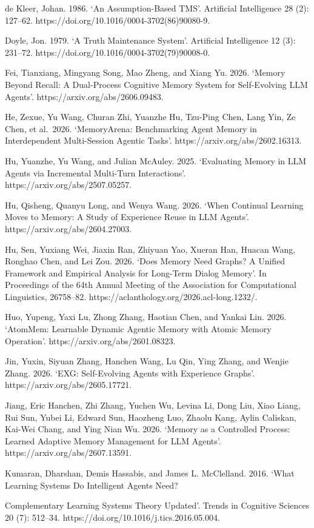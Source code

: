 \documentclass[
  english,
  a4paper,
  DIV=11,
  numbers=noendperiod]{scrreprt}
\begin{document}
de Kleer, Johan. 1986. `An Assumption-Based TMS'. Artificial
Intelligence 28 (2): 127--62.
https://doi.org/10.1016/0004-3702(86)90080-9.

Doyle, Jon. 1979. `A Truth Maintenance System'. Artificial Intelligence
12 (3): 231--72. https://doi.org/10.1016/0004-3702(79)90008-0.

Fei, Tianxiang, Mingyang Song, Mao Zheng, and Xiang Yu. 2026. `Memory
Beyond Recall: A Dual-Process Cognitive Memory System for Self-Evolving
LLM Agents'. https://arxiv.org/abs/2606.09483.

He, Zexue, Yu Wang, Churan Zhi, Yuanzhe Hu, Tzu-Ping Chen, Lang Yin, Ze
Chen, et al.~2026. `MemoryArena: Benchmarking Agent Memory in
Interdependent Multi-Session Agentic Tasks'.
https://arxiv.org/abs/2602.16313.

Hu, Yuanzhe, Yu Wang, and Julian McAuley. 2025. `Evaluating Memory in
LLM Agents via Incremental Multi-Turn Interactions'.
https://arxiv.org/abs/2507.05257.

Hu, Qisheng, Quanyu Long, and Wenya Wang. 2026. `When Continual Learning
Moves to Memory: A Study of Experience Reuse in LLM Agents'.
https://arxiv.org/abs/2604.27003.

Hu, Sen, Yuxiang Wei, Jiaxin Ran, Zhiyuan Yao, Xueran Han, Huacan Wang,
Ronghao Chen, and Lei Zou. 2026. `Does Memory Need Graphs? A Unified
Framework and Empirical Analysis for Long-Term Dialog Memory'. In
Proceedings of the 64th Annual Meeting of the Association for
Computational Linguistics, 26758--82.
https://aclanthology.org/2026.acl-long.1232/.

Huo, Yupeng, Yaxi Lu, Zhong Zhang, Haotian Chen, and Yankai Lin. 2026.
`AtomMem: Learnable Dynamic Agentic Memory with Atomic Memory
Operation'. https://arxiv.org/abs/2601.08323.

Jin, Yuxin, Siyuan Zhang, Hanchen Wang, Lu Qin, Ying Zhang, and Wenjie
Zhang. 2026. `EXG: Self-Evolving Agents with Experience Graphs'.
https://arxiv.org/abs/2605.17721.

Jiang, Eric Hanchen, Zhi Zhang, Yuchen Wu, Levina Li, Dong Liu, Xiao
Liang, Rui Sun, Yubei Li, Edward Sun, Haozheng Luo, Zhaolu Kang, Aylin
Caliskan, Kai-Wei Chang, and Ying Nian Wu. 2026. `Memory as a Controlled
Process: Learned Adaptive Memory Management for LLM Agents'.
https://arxiv.org/abs/2607.13591.

Kumaran, Dharshan, Demis Hassabis, and James L. McClelland. 2016. `What
Learning Systems Do Intelligent Agents Need?

Complementary Learning Systems Theory Updated'. Trends in Cognitive
Sciences 20 (7): 512--34. https://doi.org/10.1016/j.tics.2016.05.004.
\end{document}
